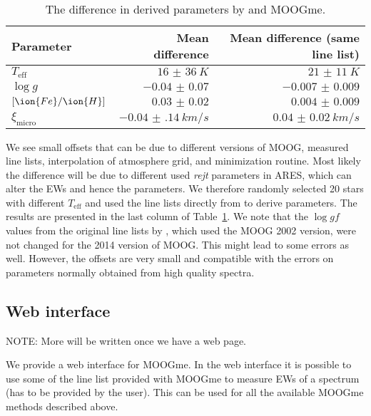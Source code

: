 \documentclass{aa}
\begin{document}
\begin{table}[htb!]
    \caption{The difference in derived parameters by \citet{Sousa2011}
    and MOOGme.}
    \label{tab:MOOGmeTest}
    \centering
    \begin{tabular}{lrr}
      \hline\hline
      Parameter             &  Mean difference         & Mean difference (same line list) \\
      \hline
      $T_\mathrm{eff}$      &  $\SI{16(36)}{K}$        & $\SI{21(11)}{K}$                 \\
      $\log g$              &  $\num{-0.04(7)}$        & $\num{-0.007(9)}$                \\
      $[\ion{Fe}/\ion{H}]$  &  $\num{0.03(2)}$         & $\num{0.004(9)}$                 \\
      $\xi_\mathrm{micro}$  &  $\SI{-0.04(14)}{km/s}$  & $\SI{0.04(2)}{km/s}$             \\
      \hline
    \end{tabular}
\end{table}

We see small offsets that can be due to different versions of MOOG, measured
line lists, interpolation of atmosphere grid, and minimization routine. Most
likely the difference will be due to different used \emph{rejt} parameters
in ARES, which can alter the EWs and hence the parameters. We therefore randomly
selected 20 stars with different $T_\mathrm{eff}$ and used the line lists
directly from \citet{Sousa2011} to derive parameters. The results are
presented in the last column of Table~\ref{tab:MOOGmeTest}. We note that
the $\log gf$ values from the original line lists by \citet{Sousa2011}, which
used the MOOG 2002 version, were not changed for the 2014 version of MOOG.
This might lead to some errors as well. However, the offsets are very small
and compatible with the errors on parameters normally obtained from high
quality spectra.


\subsection{Web interface}
\label{sub:Web interface}
NOTE: More will be written once we have a web page.

We provide a web interface for MOOGme. In the web interface it is
possible to use some of the line list provided with MOOGme to
measure EWs of a spectrum (has to be provided by the user). This
can be used for all the available MOOGme methods described above.
\end{document}
